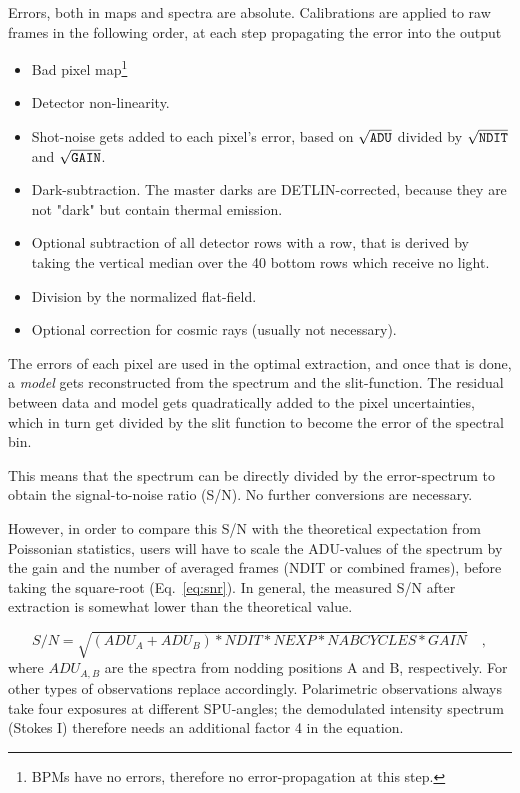Errors, both in maps and spectra are absolute. Calibrations are applied to raw
frames in the following order, at each step propagating the error into the
output
\begin{itemize}
    \item Bad pixel map\footnote{BPMs have no errors, therefore no
    error-propagation at this step.}
    \item Detector non-linearity.
    \item Shot-noise gets added to each pixel's error, based on $\sqrt{\verb!ADU!}$
    divided by $\sqrt{\verb!NDIT!}$ and $\sqrt{\verb!GAIN!}$.
    \item Dark-subtraction. The master darks are DETLIN-corrected, because they
    are not "dark" but contain thermal emission.
    \item Optional subtraction of all detector rows with a row, that is derived
    by taking the vertical median over the 40 bottom rows which receive no
    light.
    \item Division by the normalized flat-field.
    \item Optional correction for cosmic rays (usually not necessary).
\end{itemize}


The errors of each pixel are used in the optimal extraction, and once that is
done, a \emph{model} gets reconstructed from the spectrum and the slit-function.
The residual between data and model gets quadratically added to the pixel
uncertainties, which in turn get divided by the slit function to become the
error of the spectral bin.

This means that the spectrum can be directly divided by the error-spectrum to
obtain the signal-to-noise ratio (S/N). No further conversions are necessary.

However, in order to compare this S/N with the theoretical expectation from
Poissonian statistics, users will have to scale the ADU-values of the spectrum
by the gain and the number of averaged frames (NDIT or combined frames), before
taking the square-root (Eq.~\ref{eq:snr}). In general, the measured S/N after
extraction is somewhat lower than the theoretical value.

\begin{equation}
    \label{eq:snr}
    S/N = \sqrt{(ADU_A+ADU_B)*NDIT*NEXP*NABCYCLES*GAIN}\quad ,
\end{equation}
where $ADU_{A,B}$ are the spectra from nodding positions A and B, respectively.
For other types of observations replace accordingly. Polarimetric observations
always take four exposures at different SPU-angles; the demodulated intensity
spectrum (Stokes I) therefore needs an additional factor 4 in the equation.

